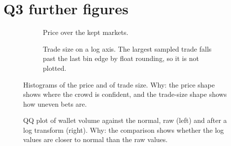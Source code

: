\section{Q3 further figures}\label{sec:app-q3}
\begin{figure}[H]
\centering
\begin{subfigure}[t]{0.49\linewidth}\centering
{}
\caption{Price \pOne{} over the kept markets.}
\label{fig:hist-price}
\end{subfigure}\hfill
\begin{subfigure}[t]{0.49\linewidth}\centering
{}
\caption{Trade size on a log axis. The largest sampled trade falls past the last bin edge by float rounding, so it is not plotted.}
\label{fig:hist-size}
\end{subfigure}
\caption{Histograms of the price and of trade size. Why: the price shape shows where the crowd is confident, and the trade-size shape shows how uneven bets are.}%
\label{fig:hist}
\end{figure}

\begin{figure}[H]
\centering
{}
\caption{QQ plot of wallet volume against the normal, raw (left) and after a log transform (right). Why: the comparison shows whether the log values are closer to normal than the raw values.}%
\label{fig:qq-wallet}
\end{figure}
